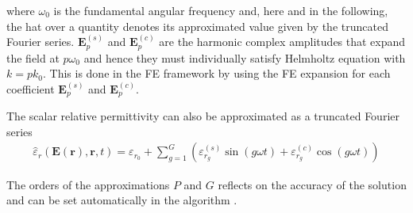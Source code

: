 \documentclass[journal]{IEEEtran}
\renewcommand{\vec}[1]{\mathbf{#1}}
\begin{document}
\noindent where $\omega_0$ is the fundamental angular frequency and, here and in
the following, the hat over a quantity denotes its approximated value given by
the truncated Fourier series. 
$\vec{E}_{p}^{(s)}$ and $\vec{E}_{p}^{(c)}$ are the harmonic complex amplitudes that expand the field at $p\omega_0$ and hence they must individually
satisfy Helmholtz equation with $k=pk_0$. This is done in the FE framework
by using the FE expansion for each coefficient
$\vec{E}_{p}^{(s)}$ and $\vec{E}_{p}^{(c)}$.

The scalar relative permittivity can also be approximated as a truncated Fourier
series \cite{Copeland2010}
%
\begin{eqnarray} \label{eq:eps}
\hat{{\varepsilon}}_r(\vec{E}(\vec{r}), \vec{r}, t) = {\varepsilon}_{r_0} + \sum^G_{g=1} 
\left( {\varepsilon}_{r_g}^{(s)} \sin(g \omega t) + {\varepsilon}_{r_g}^{(c)} \cos(g \omega t)
\right)
\end{eqnarray} 

The orders of the approximations $P$ and $G$ reflects on the accuracy
of the solution and can be set
automatically in the algorithm \cite{Gyselinck2002}.
\end{document}
